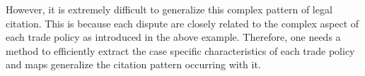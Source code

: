 However, it is extremely difficult to generalize this complex pattern of legal citation.
This is because each dispute are closely related to the complex aspect of each trade policy as introduced in the above example. 
Therefore, one needs a method to efficiently extract the case specific characteristics of each trade policy and maps generalize 
the citation pattern occurring with it.


